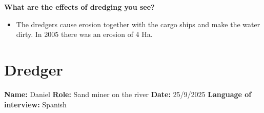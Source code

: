 \newpage
\textbf{What are the effects of dredging you see?}
\begin{itemize}
    \item The dredgers cause erosion together with the cargo ships and make the water dirty. In 2005 there was an erosion of 4 Ha.
\end{itemize}

\section{Dredger}
\textbf{Name:} Daniel \newline
\textbf{Role:} Sand miner on the river\newline
\textbf{Date:} 25/9/2025 \newline
\textbf{Language of interview:} Spanish \newline \newline


